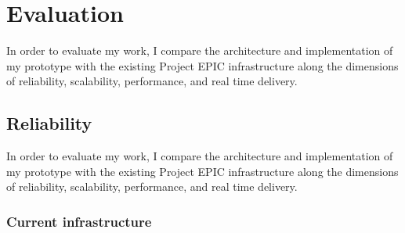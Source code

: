 
\chapter{Evaluation} %

\label{Chapter6} %

In order to evaluate my work, I  compare the architecture and implementation of my prototype with the existing Project EPIC infrastructure along the dimensions of reliability, scalability, performance, and real time delivery.

\section{Reliability}

In order to evaluate my work, I  compare the architecture and implementation of my prototype with the existing Project EPIC infrastructure along the dimensions of reliability, scalability, performance, and real time delivery.

\subsection{Current infrastructure}

